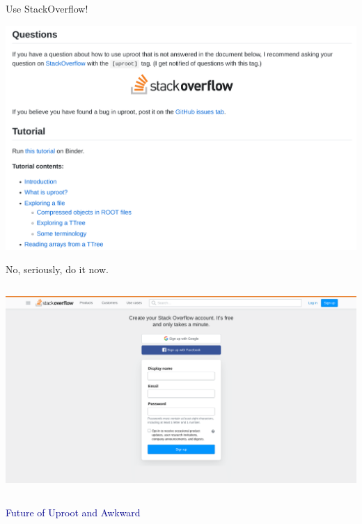 \documentclass[aspectratio=169]{beamer}
\begin{document}
\begin{frame}{Use StackOverflow!}
\begin{center}
\includegraphics[width=0.88\linewidth]{uproot-stackoverflow.png}
\end{center}
\end{frame}

\begin{frame}{No, seriously, do it now.}
\vspace{0.15 cm}
\begin{columns}
\includegraphics[width=\linewidth]{stackoverflow-signup.png}
\end{columns}
\end{frame}

\begin{frame}{}
\huge
\vspace{1 cm}
\begin{center}
\textcolor{darkblue}{Future of Uproot and Awkward}
\end{center}
\end{frame}
\end{document}
